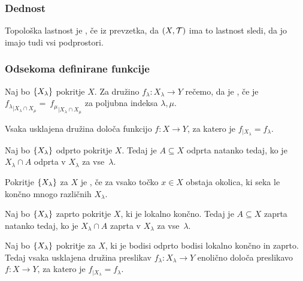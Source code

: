 \subsubsection{Dednost}
\begin{definicija}
    Topološka lastnost je , če iz prevzetka, da $(X, \mathcal{T})$ ima to lastnost sledi, da jo imajo tudi vsi podprostori.
\end{definicija}

\subsubsection{Odsekoma definirane funkcije}

\begin{definicija}
    Naj bo $\left\{X_\lambda\right\}$ pokritje $X$. Za družino $f_\lambda: X_\lambda \to Y$ rečemo, da je , če je ${f_\lambda}_{|X_\lambda \cap X_\mu} =~{f_\mu}_{|X_\lambda \cap X_\mu}$ za poljubna indeksa $\lambda, \mu$.
\end{definicija}

\begin{trditev}
    Vsaka usklajena družina določa funkcijo $f: X \to Y$, za katero je $f_{|X_\lambda} = f_\lambda$.
\end{trditev}

\begin{lema}
    Naj bo $\left\{X_\lambda\right\}$ odprto pokritje $X$. Tedaj je $A \subseteq X$ odprta natanko tedaj, ko je $X_\lambda \cap A$ odprta v $X_\lambda$ za vse~$\lambda$.
\end{lema}

\begin{definicija}
    Pokritje $\left\{X_\lambda\right\}$ za $X$ je , če za vsako točko $x \in X$ obstaja okolica, ki seka le končno mnogo različnih $X_\lambda$.
\end{definicija}

\begin{lema}
    Naj bo $\left\{X_\lambda\right\}$ zaprto pokritje $X$, ki je lokalno končno. Tedaj je $A \subseteq X$ zaprta natanko tedaj, ko je $X_\lambda \cap A$ zaprta v $X_\lambda$ za vse~$\lambda$.
\end{lema}

\begin{izrek}
    Naj bo $\left\{X_\lambda\right\}$ pokritje za $X$, ki je bodisi odprto bodisi lokalno končno in zaprto. Tedaj vsaka usklajena družina preslikav $f_\lambda: X_\lambda \to Y$ enolično določa preslikavo $f: X \to Y$, za katero je $f_{|X_\lambda} = f_\lambda$.
\end{izrek}

